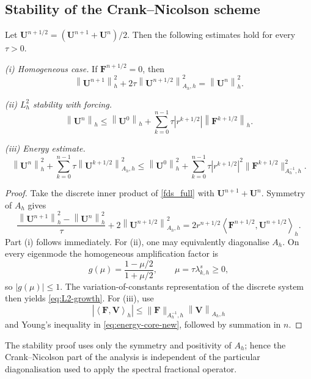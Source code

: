 \documentclass[reqno]{amsart}
\newcommand{\Ah}{A_h}
\newcommand{\ip}[2]{\left\langle #1,#2\right\rangle_h}
\newcommand{\normh}[1]{\left\|#1\right\|_h}
\newcommand{\normAh}[1]{\left\|#1\right\|_{A_h,h}}
\begin{document}
\subsection{Stability of the Crank--Nicolson scheme}
\begin{theorem}\label{thm:stability}
Let $\mathbf U^{n+1/2}=(\mathbf U^{n+1}+\mathbf U^n)/2$. Then the following estimates hold for every $\tau>0$.

\emph{(i) Homogeneous case.} If $\mathbf F^{n+1/2}=0$, then
\begin{equation}\label{eq:CN-homogeneous-identity}
 \normh{\mathbf U^{n+1}}^2
 +2\tau\normAh{\mathbf U^{n+1/2}}^2
 =\normh{\mathbf U^n}^2.
\end{equation}

\emph{(ii) $L^2_h$ stability with forcing.}
\begin{equation}\label{eq:L2-growth}
 \normh{\mathbf U^n}
 \le \normh{\mathbf U^0}
 +\sum_{k=0}^{n-1}\tau |r^{k+1/2}|\normh{\mathbf F^{k+1/2}}.
\end{equation}

\emph{(iii) Energy estimate.}
\begin{equation}\label{eq:energy-bound}
 \normh{\mathbf U^n}^2
 +\sum_{k=0}^{n-1}\tau\normAh{\mathbf U^{k+1/2}}^2
 \le \normh{\mathbf U^0}^2
 +\sum_{k=0}^{n-1}\tau |r^{k+1/2}|^2
 \|\mathbf F^{k+1/2}\|_{A_h^{-1},h}^2.
\end{equation}
\end{theorem}
\begin{proof}
Take the discrete inner product of \eqref{fds_full} with
$\mathbf U^{n+1}+\mathbf U^n$. Symmetry of $\Ah$ gives
\begin{equation}\label{eq:energy-core-new}
 \frac{\normh{\mathbf U^{n+1}}^2-\normh{\mathbf U^n}^2}{\tau}
 +2\normAh{\mathbf U^{n+1/2}}^2
 =2r^{n+1/2}\ip{\mathbf F^{n+1/2}}{\mathbf U^{n+1/2}}.
\end{equation}
Part (i) follows immediately. For (ii), one may equivalently diagonalise $\Ah$. On every eigenmode the homogeneous amplification factor is
\[
 g(\mu)=\frac{1-\mu/2}{1+\mu/2},\qquad \mu=\tau\lambda_{k,h}^s\ge0,
\]
so $|g(\mu)|\le1$. The variation-of-constants representation of the discrete system then yields \eqref{eq:L2-growth}. For (iii), use
\[
 |\ip{\mathbf F}{\mathbf V}|
 \le \|\mathbf F\|_{A_h^{-1},h}\normAh{\mathbf V}
\]
and Young's inequality in \eqref{eq:energy-core-new}, followed by summation in $n$.
\end{proof}

\begin{remark}
The stability proof uses only the symmetry and positivity of $\Ah$; hence the Crank--Nicolson part of the analysis is independent of the particular diagonalisation used to apply the spectral fractional operator.
\end{remark}
\end{document}
